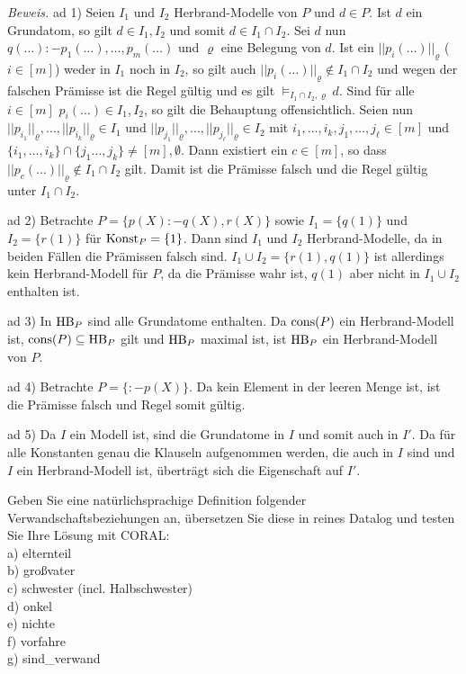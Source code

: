 \documentclass[12pt,a4paper]{amsart}
\begin{document}
{\em Beweis.}
ad 1) Seien $I_1$ und $I_2$ Herbrand-Modelle von $P$ und $d\in P$. Ist $d$ ein Grundatom, so gilt $d\in I_1,I_2$ und somit $d\in I_1\cap I_2$. Sei $d$ nun $q(\dots):-
p_1(\dots),\dots,p_m(\dots)$ und $\varrho$ eine Belegung von $d$. Ist ein $||p_i(\dots)||_{\varrho}$ ($i\in[m]$) weder in $I_1$ noch in $I_2$, so gilt auch 
$||p_i(\dots)||_{\varrho}\not\in I_1\cap I_2$ und wegen der falschen Prämisse ist die Regel gültig und es gilt $\models_{I_1\cap I_2,\varrho}d$. Sind für alle $i\in[m]$ $p_i(\dots)\in I_1,I_2$, so gilt die Behauptung offensichtlich. Seien nun $||p_{i_1}||_{\varrho},\dots,||p_{i_k}||_{\varrho}\in I_1$ und $||p_{j_1}||_{\varrho},\dots,||p_{j_{\ell}}||_{\varrho}\in I_2$ mit $i_1,\dots,i_k,j_1,\dots,j_{\ell}\in[m]$ und $\{i_1,\dots,i_k\}\cap\{j_1\dots,j_k\}\neq[m],\emptyset$. Dann existiert ein $c\in[m]$,
so dass $||p_c(\dots)||_{\varrho}\not\in I_1\cap I_2$ gilt. Damit ist die Prämisse falsch und die Regel gültig unter $I_1\cap I_2$.

\medskip

ad 2) Betrachte $P=\{p(X):-q(X),r(X)\}$ sowie $I_1=\{q(1)\}$ und $I_2=\{r(1)\}$ für $\operatorname{Konst}_P=\{1\}$. Dann sind $I_1$ und $I_2$ Herbrand-Modelle, da in beiden Fällen
die Prämissen falsch sind. $I_1\cup I_2=\{r(1),q(1)\}$ ist allerdings kein Herbrand-Modell für $P$, da die Prämisse wahr ist, $q(1)$ aber nicht in $I_1\cup I_2$ enthalten ist.

\medskip

ad 3) In $\operatorname{HB}_P$ sind alle Grundatome enthalten. Da $\operatorname{cons}(P)$ ein Herbrand-Modell ist, $\operatorname{cons}(P)\subseteq\operatorname{HB}_P$ gilt und $\operatorname{HB}_P$ maximal ist, ist $\operatorname{HB}_P$ ein Herbrand-Modell von $P$.

\medskip

ad 4) Betrachte $P=\{:-p(X)\}$. Da kein Element in der leeren Menge ist, ist die Prämisse falsch und Regel somit gültig.

\medskip

ad 5) Da $I$ ein Modell ist, sind die Grundatome in $I$ und somit auch in $I'$. Da für alle Konstanten genau die Klauseln aufgenommen werden, die auch in $I$ sind und
$I$ ein Herbrand-Modell ist, überträgt sich die Eigenschaft auf $I'$.

\begin{aufgabe1}
Geben Sie eine natürlichsprachige Definition folgender Verwandschaftsbeziehungen an, übersetzen Sie diese in reines Datalog und testen Sie Ihre Lösung mit CORAL:\\
a) elternteil \\
b) großvater \\
c) schwester (incl. Halbschwester) \\
d) onkel \\
e) nichte \\
f) vorfahre \\
g) sind\_verwand 
\end{aufgabe1}
\end{document}
